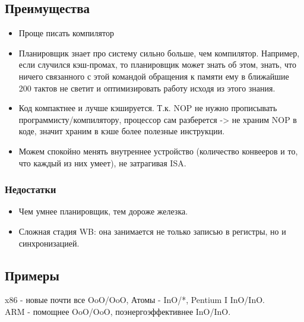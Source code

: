 \documentclass[12pt, a4paper]{article}
\begin{document}
\subsection{Преимущества}
\begin{itemize}
    \item Проще писать компилятор
    \item Планировщик знает про систему сильно больше, чем компилятор. Например, если случился кэш-промах, то планировщик может знать об этом, знать, что ничего связанного с этой командой обращения к памяти ему в ближайшие 200 тактов не светит и оптимизировать работу исходя из этого знания. 
    \item Код компактнее и лучше кэшируется. Т.к. NOP не нужно прописывать программисту/компилятору, процессор сам разберется -> не храним NOP в коде, значит храним в кэше более полезные инструкции.
    \item Можем спокойно менять внутреннее устройство (количество конвееров и то, что каждый из них умеет), не затрагивая ISA.
\end{itemize}
\subsubsection{Недостатки}
\begin{itemize}
    \item Чем умнее планировщик, тем дороже железка.
    \item Сложная стадия WB: она занимается не только записью в регистры, но и синхронизацией.
\end{itemize}
\subsection{Примеры}
x86 - новые почти все OoO/OoO, Атомы - InO/*, Pentium I InO/InO.\\
ARM - помощнее OoO/OoO, поэнергоэффективнее InO/InO.
\end{document}
